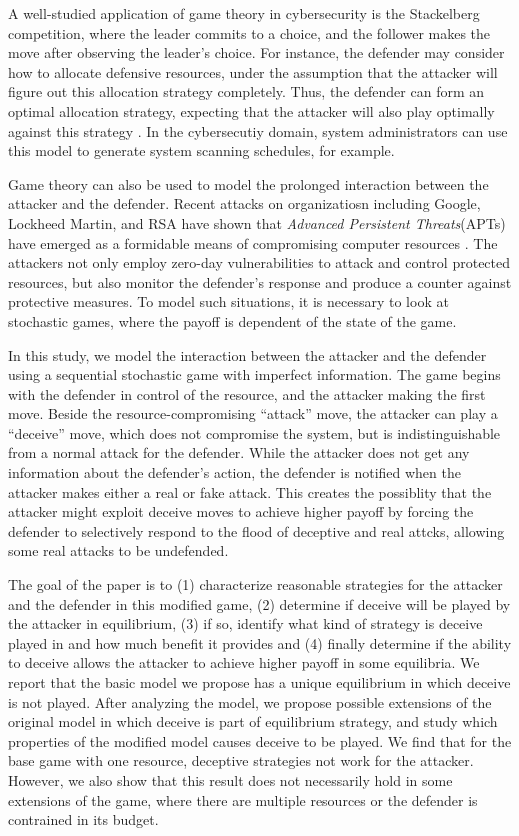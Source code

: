 \documentclass[11pt]{article}
\theoremstyle{plain}
\begin{document}
A well-studied application of game theory in cybersecurity is the Stackelberg competition, where the leader commits to a choice, and the follower makes the move after observing the leader's choice. For instance, the defender may consider how to allocate defensive resources, under the assumption that the attacker will figure out this allocation strategy completely. Thus, the defender can form an optimal allocation strategy, expecting that the attacker will also play optimally against this strategy \cite{Tambe1}. In the cybersecutiy domain, system administrators can use this model to generate system scanning schedules, for example.

Game theory can also be used to model the prolonged interaction between the attacker and the defender. Recent attacks on organizatiosn including Google, Lockheed Martin, and RSA have shown that \textit{Advanced Persistent Threats}(APTs) have emerged as a formidable means of compromising computer resources\cite{Cole1} . The attackers not only employ zero-day vulnerabilities to attack and control protected resources, but also monitor the defender's response and produce a counter against protective measures\cite{Allsopp1}. To model such situations, it is necessary to look at stochastic games, where the payoff is dependent of the state of the game\cite{Hu1}\cite{Rass1}\cite{Rass2}.

In this study, we model the interaction between the attacker and the defender using a sequential stochastic game with imperfect information. The game begins with the defender in control of the resource, and the attacker making the first move. Beside the resource-compromising ``attack'' move, the attacker can play a “deceive” move, which does not compromise the system, but is indistinguishable from a normal attack for the defender. While the attacker does not get any information about the defender's action, the defender is notified when the attacker makes either a real or fake attack. This creates the possiblity that the attacker might exploit deceive moves to achieve higher payoff by forcing the defender to selectively respond to the flood of deceptive and real attcks, allowing some real attacks to be undefended. 

The goal of the paper is to (1) characterize
reasonable strategies for the attacker and the defender in this modified game, (2)
determine if deceive will be played by the attacker in equilibrium, (3) if so, identify
what kind of strategy is deceive played in and how much benefit it provides and (4)
finally determine if the ability to deceive allows the attacker to achieve higher payoff in some equilibria. We report that the basic model we propose has a unique equilibrium in which deceive is not played. After analyzing the model, we propose possible extensions of the original model in which deceive is part of equilibrium strategy, and study which properties of the modified model causes deceive to be played. We find that for the base game with one resource, deceptive strategies not work for the attacker. However, we also show that this result does not necessarily hold in some extensions of the game, where there are multiple resources or the defender is contrained in its budget.
\end{document}
